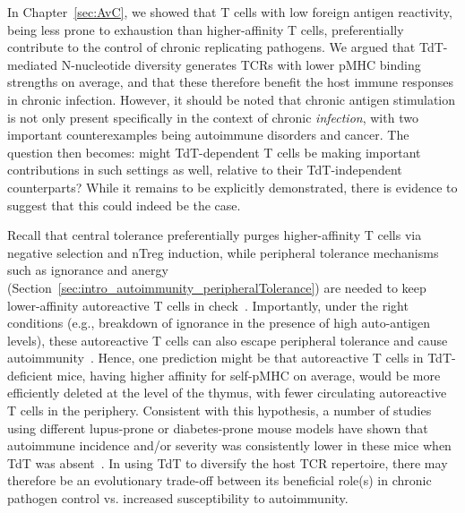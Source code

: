In Chapter~\ref{sec:AvC}, we showed that T cells with low foreign antigen reactivity, being less prone to exhaustion than higher-affinity T cells, preferentially contribute to the control of chronic replicating pathogens. We argued that TdT-mediated N-nucleotide diversity generates TCRs with lower pMHC binding strengths on average, and that these therefore benefit the host immune responses in chronic infection. However, it should be noted that chronic antigen stimulation is not only present specifically in the context of chronic \textit{infection}, with two important counterexamples being autoimmune disorders and cancer. The question then becomes: might TdT-dependent T cells be making important contributions in such settings as well, relative to their TdT-independent counterparts? While it remains to be explicitly demonstrated, there is evidence to suggest that this could indeed be the case.

Recall that central tolerance preferentially purges higher-affinity T cells via negative selection and nTreg induction, while peripheral tolerance mechanisms such as ignorance and anergy (Section~\ref{sec:intro_autoimmunity_peripheralTolerance}) are needed to keep lower-affinity autoreactive T cells in check~\cite{zehn2006t,leube2023single}. Importantly, under the right conditions (e.g., breakdown of ignorance in the presence of high auto-antigen levels), these autoreactive T cells can also escape peripheral tolerance and cause autoimmunity~\cite{zehn2006t}. Hence, one prediction might be that autoreactive T cells in TdT-deficient mice, having higher affinity for self-pMHC on average, would be more efficiently deleted at the level of the thymus, with fewer circulating autoreactive T cells in the periphery. Consistent with this hypothesis, a number of studies using different lupus-prone or diabetes-prone mouse models have shown that autoimmune incidence and/or severity was consistently lower in these mice when TdT was absent~\cite{conde1998terminal,feeney2001terminal,robey2004terminal}. In using TdT to diversify the host TCR repertoire, there may therefore be an evolutionary trade-off between its beneficial role(s) in chronic pathogen control vs. increased susceptibility to autoimmunity.

